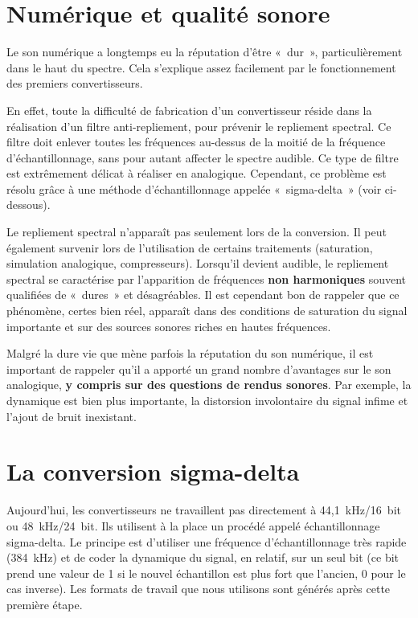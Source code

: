 \documentclass[
]{book}
\begin{document}
\hypertarget{numuxe9rique-et-qualituxe9-sonore}{%
\section{Numérique et qualité sonore}\label{numuxe9rique-et-qualituxe9-sonore}}

Le son numérique a longtemps eu la réputation d'être «~dur~», particulièrement dans le haut du spectre. Cela s'explique assez facilement par le fonctionnement des premiers convertisseurs.

En effet, toute la difficulté de fabrication d'un convertisseur réside dans la réalisation d'un filtre anti-repliement, pour prévenir le repliement spectral. Ce filtre doit enlever toutes les fréquences au-dessus de la moitié de la fréquence d'échantillonnage, sans pour autant affecter le spectre audible. Ce type de filtre est extrêmement délicat à réaliser en analogique. Cependant, ce problème est résolu grâce à une méthode d'échantillonnage appelée «~sigma-delta~» (voir ci-dessous).

Le repliement spectral n'apparaît pas seulement lors de la conversion. Il peut également survenir lors de l'utilisation de certains traitements (saturation, simulation analogique, compresseurs). Lorsqu'il devient audible, le repliement spectral se caractérise par l'apparition de fréquences \textbf{non harmoniques} souvent qualifiées de «~dures~» et désagréables. Il est cependant bon de rappeler que ce phénomène, certes bien réel, apparaît dans des conditions de saturation du signal importante et sur des sources sonores riches en hautes fréquences.

Malgré la dure vie que mène parfois la réputation du son numérique, il est important de rappeler qu'il a apporté un grand nombre d'avantages sur le son analogique, \textbf{y compris sur des questions de rendus sonores}. Par exemple, la dynamique est bien plus importante, la distorsion involontaire du signal infime et l'ajout de bruit inexistant.

\hypertarget{la-conversion-sigma-delta}{%
\section{La conversion sigma-delta}\label{la-conversion-sigma-delta}}

Aujourd'hui, les convertisseurs ne travaillent pas directement à 44,1~kHz/16~bit ou 48~kHz/24~bit. Ils utilisent à la place un procédé appelé échantillonnage sigma-delta. Le principe est d'utiliser une fréquence d'échantillonnage très rapide (384~kHz) et de coder la dynamique du signal, en relatif, sur un seul bit (ce bit prend une valeur de 1 si le nouvel échantillon est plus fort que l'ancien, 0 pour le cas inverse). Les formats de travail que nous utilisons sont générés après cette première étape.
\end{document}
